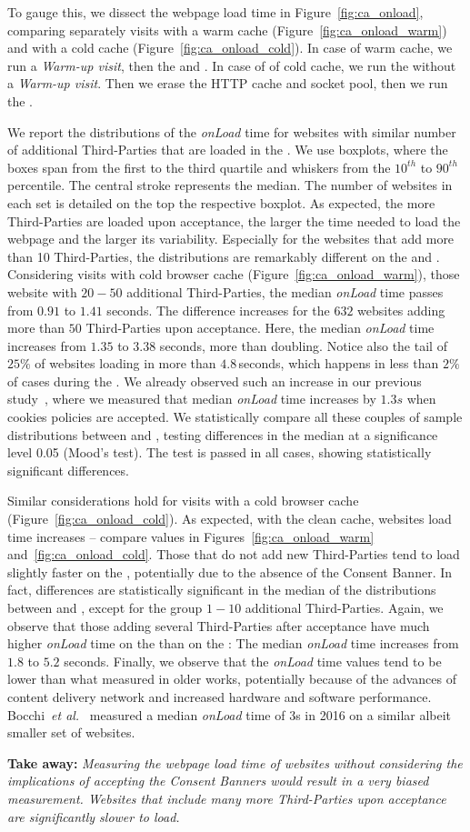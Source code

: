 To gauge this, we dissect the webpage load time in Figure~\ref{fig:ca_onload}, comparing separately visits with a warm cache (Figure~\ref{fig:ca_onload_warm}) and with a cold cache (Figure~\ref{fig:ca_onload_cold}). In case of warm cache, we run a \emph{Warm-up visit}, then the \BEFORE and \AFTER. In case of of cold cache, we run the \BEFORE without a \emph{Warm-up visit}. Then we erase the HTTP cache and socket pool, then we run the \AFTER.

We report the distributions of the \textit{onLoad} time for websites with similar number of additional Third-Parties that are loaded in the \AFTER. We use boxplots, where the boxes span from the first to the third quartile and whiskers from the $10^{th}$ to $90^{th}$ percentile. The central stroke represents the median. The number of websites in each set is detailed on the top the respective boxplot. As expected, the more Third-Parties are loaded upon acceptance, the larger the time needed to load the webpage and the larger its variability. Especially for the websites that add more than 10 Third-Parties, the distributions are remarkably different on the \BEFORE and \AFTER. Considering visits with cold browser cache (Figure~\ref{fig:ca_onload_warm}), those website with $20-50$ additional Third-Parties, the median \textit{onLoad} time passes from $0.91$ to $1.41$ seconds. The difference increases for the $632$ websites adding more than $50$ Third-Parties upon acceptance. Here, the median \textit{onLoad} time increases from $1.35$ to $3.38$ seconds, more than doubling. Notice also the tail of $25\%$ of websites loading in more than $4.8$\,seconds, which happens in less than $2\%$ of cases during the \BEFORE. We already observed such an increase in our previous study~\cite{traverso2017benchmark}, where we measured that median \textit{onLoad} time increases by $1.3s$ when cookies policies are accepted. 
We statistically compare all these couples of sample distributions between  \BEFORE and \AFTER, testing differences in the median at a significance level 0.05 (Mood's test). The test is passed in all cases, showing statistically significant differences.


Similar considerations hold for visits with a cold browser cache (Figure~\ref{fig:ca_onload_cold}). As expected, with the clean cache, websites load time increases -- compare values in Figures~\ref{fig:ca_onload_warm} and~\ref{fig:ca_onload_cold}. Those that do not add new Third-Parties tend to load slightly faster on the \AFTER, potentially due to the absence of the Consent Banner. In fact, differences are statistically significant in the median of the distributions between \BEFORE and \AFTER,  except for the group $1-10$ additional Third-Parties.
Again, we observe that those adding several Third-Parties after acceptance have much higher \textit{onLoad} time on the \AFTER than on the \BEFORE:  The median \textit{onLoad} time increases from $1.8$ to $5.2$ seconds. Finally, we observe that the \textit{onLoad} time values tend to be lower than what measured in older works, potentially because of the advances of content delivery network and increased hardware and software performance. Bocchi~\emph{et al.}~\cite{bocchi2016measuring} measured a median \textit{onLoad} time of 3s in 2016 on a similar albeit smaller set of websites.

\textbf{Take away:} 
\textit{Measuring the webpage load time of websites without considering the implications of accepting the Consent Banners would result in a very biased measurement. Websites that include many more Third-Parties upon acceptance are significantly slower to load.}